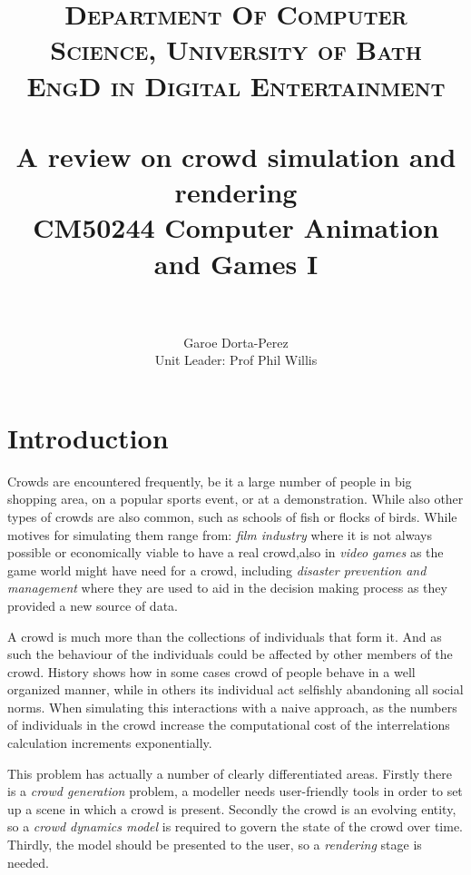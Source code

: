 \documentclass[11pt,twocolumn]{article}
\title{	
\normalfont \normalsize 
\textsc{Department Of Computer Science, University of Bath} \\ [5pt] %
\textsc{EngD in Digital Entertainment} \\ [5pt] 
\horrule{0.7pt} \\[0.2cm] %
\Huge A review on crowd simulation and rendering \\ %
\vspace{7 mm}
\Large CM50244 \: Computer Animation and Games I \\
\horrule{0.7pt} \\[0.0cm] %
}
\author{Garoe Dorta-Perez \\ \Large Unit Leader: Prof Phil Willis \\}  %
\numberwithin{equation}{section} %
\numberwithin{figure}{section} %
\numberwithin{table}{section} %
\begin{document}
\vspace*{\fill}
\begin{center}
\begin{minipage}{1.0\textwidth}

\clearpage\maketitle %
\thispagestyle{empty}

\end{minipage}
\end{center}
\vfill
\clearpage
\setcounter{page}{1}



\section{Introduction}

Crowds are encountered frequently, be it a large number of people in big shopping area, on a popular sports event, or at a demonstration.
While also other types of crowds are also common, such as schools of fish or flocks of birds.
While motives for simulating them range from: \textit{film industry} where it is not always possible or economically viable to have a real crowd,also in \textit{video games} as the game world might have need for a crowd, including \textit{disaster prevention and management} where they are used to aid in the decision making process as they provided a new source of data.

A crowd is much more than the collections of individuals that form it.
And as such the behaviour of the individuals could be affected by other members of the crowd.
History shows how in some cases crowd of people behave in a well organized manner, while in others its individual act selfishly abandoning all social norms.
When simulating this interactions with a naive approach, as the numbers of individuals in the crowd increase the computational cost of the interrelations calculation increments exponentially.

This problem has actually a number of clearly differentiated areas.
Firstly there is a \textit{crowd generation} problem, a modeller needs user-friendly tools in order to set up a scene in which a crowd is present.
Secondly the crowd is an evolving entity, so a \textit{crowd dynamics model} is required to govern the state of the crowd over time.
Thirdly, the model should be presented to the user, so a \textit{rendering} stage is needed.
\end{document}
